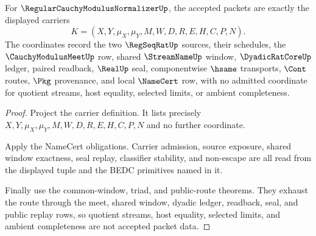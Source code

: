 \begin{theorem}
\label{thm:regular-cauchy-modulus-normalizer-carrier-admission}
For $\RegularCauchyModulusNormalizerUp$, the accepted packets are exactly the
displayed carriers
$$
K=(X,Y,\mu_X,\mu_Y,M,W,D,R,E,H,C,P,N).
$$
The coordinates record the two $\RegSeqRatUp$ sources, their schedules, the
$\CauchyModulusMeetUp$ row, shared $\StreamNameUp$ window, $\DyadicRatCoreUp$
ledger, paired readback, $\RealUp$ seal, componentwise $\hsame$ transports,
$\Cont$ routes, $\Pkg$ provenance, and local $\NameCert$ row, with no admitted
coordinate for quotient streams, host equality, selected limits, or ambient
completeness.
\end{theorem}
\begin{proof}
Project the carrier definition. It lists precisely
$X,Y,\mu_X,\mu_Y,M,W,D,R,E,H,C,P,N$ and no further coordinate.

Apply the NameCert obligations. Carrier admission, source exposure, shared
window exactness, seal replay, classifier stability, and non-escape are all
read from the displayed tuple and the BEDC primitives named in it.

Finally use the common-window, triad, and public-route theorems. They exhaust
the route through the meet, shared window, dyadic ledger, readback, seal, and
public replay rows, so quotient streams, host equality, selected limits, and
ambient completeness are not accepted packet data.
\end{proof}

